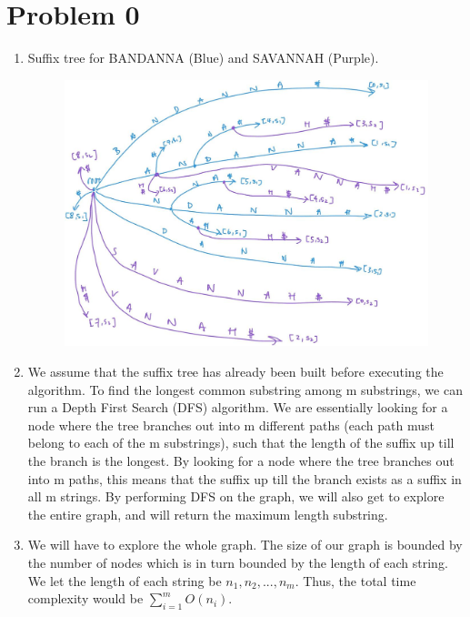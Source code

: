\documentclass[12pt,letterpaper]{article}
\begin{document}
\section*{Problem 0}

\begin{enumerate}
  \item
    Suffix tree for BANDANNA (Blue) and SAVANNAH (Purple).
    \begin{figure}[!h]
      \centering
      \includegraphics[width=1\linewidth]{suffixtree.jpg}
    \end{figure}
  \item
    We assume that the suffix tree has already been built before executing the algorithm.
    To find the longest common substring among m substrings,
    we can run a Depth First Search (DFS) algorithm.
    We are essentially looking for a node where the tree branches out into m different paths (each path must belong to each of the m substrings),
    such that the length of the suffix up till the branch is the longest.
    By looking for a node where the tree branches out into m paths, 
    this means that the suffix up till the branch exists as a suffix in all m strings.
    By performing DFS on the graph, we will also get to explore the entire graph,
    and will return the maximum length substring.
  \item 
    We will have to explore the whole graph.
    The size of our graph is bounded by the number of nodes which is in turn
    bounded by the length of each string.
    We let the length of each string be $n_{1}, n_{2}, ..., n_{m}$.
    Thus, the total time complexity would be $\sum^{m}_{i=1} O(n_{i})$.

\end{enumerate}
\end{document}
